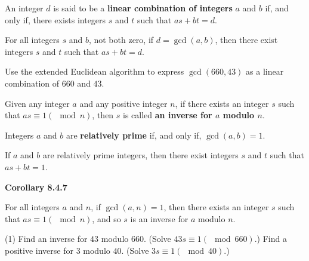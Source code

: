 \documentclass[../mathNotesPreamble]{subfiles}
\begin{document}
  \begin{defn*}
    An integer $d$ is said to be a \textbf{linear combination of integers} $a$ and $b$ if, and only if, there exists integers $s$ and $t$ such that $as+bt=d$.
  \end{defn*}

  \begin{thmBox*}
    For all integers $s$ and $b$, not both zero, if $d=\gcd(a,b)$, then there exist integers $s$ and $t$ such that $as+bt=d$.
  \end{thmBox*}

  \begin{ex*}
    Use the extended Euclidean algorithm to express $\gcd(660,43)$ as a linear combination of $660$ and $43$.
  \end{ex*}
  \pagebreak

  \begin{defn*}
    Given any integer $a$ and any positive integer $n$, if there exists an integer $s$ such that $as\equiv 1 (\mod n)$, then $s$ is called \textbf{an inverse for $a$ modulo $n$}.

    Integers $a$ and $b$ are \textbf{relatively prime} if, and only if, $\gcd(a,b)=1$.
  \end{defn*}

  \begin{thmBox*}[Corollary 8.4.6]
    If $a$ and $b$ are relatively prime integers, then there exist integers $s$ and $t$ such that $as+bt=1$.
    \vspace*{0.5\baselineskip}

    \noindent
    \textbf{Corollary 8.4.7}

    \noindent
    For all integers $a$ and $n$, if $\gcd(a,n)=1$, then there exists an integer $s$ such that $as\equiv 1 (\mod n)$, and so $s$ is an inverse for $a$ modulo $n$.
  \end{thmBox*}

  \begin{ex*}
    \mbox{}
    \begin{extasks}[after-item-skip=\stretch{1}](1)
      \task Find an inverse for $43$ modulo $660$. (Solve $43s\equiv 1 (\mod 660)$.)
      \task Find a positive inverse for $3$ modulo $40$. (Solve $3s\equiv 1 (\mod 40)$.)
    \end{extasks}
  \end{ex*}
  \pagebreak
\end{document}
